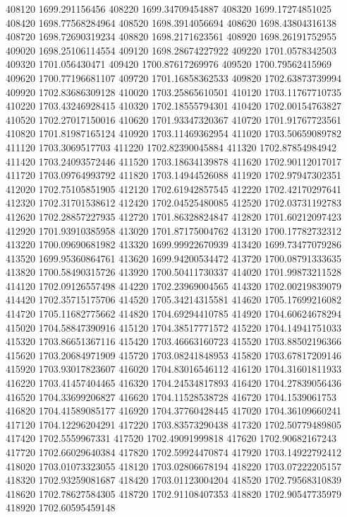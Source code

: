 {408120 1699.291156456
408220 1699.34709454887
408320 1699.17274851025
408420 1698.77568284964
408520 1698.3914056694
408620 1698.43804316138
408720 1698.72690319234
408820 1698.2171623561
408920 1698.26191752955
409020 1698.25106114554
409120 1698.28674227922
409220 1701.0578342503
409320 1701.056430471
409420 1700.87617269976
409520 1700.79562415969
409620 1700.77196681107
409720 1701.16858362533
409820 1702.63873739994
409920 1702.83686309128
410020 1703.25865610501
410120 1703.11767710735
410220 1703.43246928415
410320 1702.18555794301
410420 1702.00154763827
410520 1702.27017150016
410620 1701.93347320367
410720 1701.91767723561
410820 1701.81987165124
410920 1703.11469362954
411020 1703.50659089782
411120 1703.3069517703
411220 1702.82390045884
411320 1702.87854984942
411420 1703.24093572446
411520 1703.18634139878
411620 1702.90112017017
411720 1703.09764993792
411820 1703.14944526088
411920 1702.97947302351
412020 1702.75105851905
412120 1702.61942857545
412220 1702.42170297641
412320 1702.31701538612
412420 1702.04525480085
412520 1702.03731192783
412620 1702.28857227935
412720 1701.86328824847
412820 1701.60212097423
412920 1701.93910385958
413020 1701.87175004762
413120 1700.17782732312
413220 1700.09690681982
413320 1699.99922670939
413420 1699.73477079286
413520 1699.95360864761
413620 1699.94200534472
413720 1700.08791333635
413820 1700.58490315726
413920 1700.50411730337
414020 1701.99873211528
414120 1702.09126557498
414220 1702.23969004565
414320 1702.00219839079
414420 1702.35715175706
414520 1705.34214315581
414620 1705.17699216082
414720 1705.11682775662
414820 1704.69294410785
414920 1704.60624678294
415020 1704.58847390916
415120 1704.38517771572
415220 1704.14941751033
415320 1703.86651367116
415420 1703.46663160723
415520 1703.88502196366
415620 1703.20684971909
415720 1703.08241848953
415820 1703.67817209146
415920 1703.93017823607
416020 1704.83016546112
416120 1704.31601811933
416220 1703.41457404465
416320 1704.24534817893
416420 1704.27839056436
416520 1704.33699206827
416620 1704.11528538728
416720 1704.1539061753
416820 1704.41589085177
416920 1704.37760428445
417020 1704.36109660241
417120 1704.12296204291
417220 1703.83573290438
417320 1702.50779489805
417420 1702.5559967331
417520 1702.49091999818
417620 1702.90682167243
417720 1702.66029640384
417820 1702.59924470874
417920 1703.14922792412
418020 1703.01073323055
418120 1703.02806678194
418220 1703.07222205157
418320 1702.93259081687
418420 1703.01123004204
418520 1702.79568310839
418620 1702.78627584305
418720 1702.91108407353
418820 1702.90547735979
418920 1702.60595459148
}
